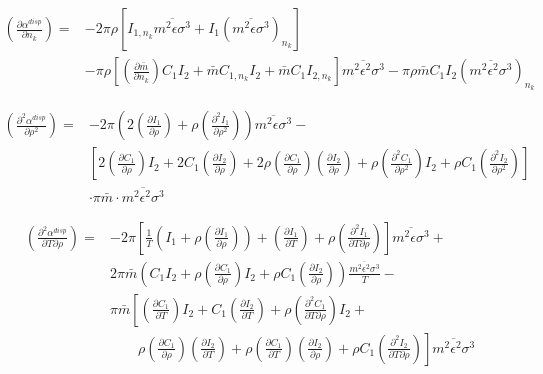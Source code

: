 \documentclass[english]{../thermomemo/thermomemo}
\newcommand*{\pder}[2]{\left(\frac{\partial #1}{\partial #2}\right)}
\newcommand*{\pdder}[2]{\left(\frac{\partial^2 #1}{\partial #2^2}\right)}
\newcommand*{\pdcross}[3]{\left(\frac{\partial^2 #1}{\partial #2 \partial #3}\right)}
\newcommand{\lp}{\left(}
\newcommand{\rp}{\right)}
\begin{document}
\begin{equation}
  \begin{aligned}
    \pder{\alpha^{disp}}{n_k} =& -2 \pi \rho \left[ I_{1,n_k} \overline{m^2 \epsilon \sigma^3} + I_1 (\overline{m^2 \epsilon \sigma^3})_{n_k} \right] \\
    &- \pi \rho \left[ \pder{\bar m}{n_k} C_1 I_2 + \bar m C_{1,n_k} I_2 + \bar m C_1 I_{2,n_k} \right] \overline{m^2 \epsilon^2 \sigma^3} - \pi \rho \bar m C_1 I_2 (\overline{m^2 \epsilon^2 \sigma^3})_{n_k}
  \end{aligned}
\end{equation}

\begin{equation}
  \begin{aligned}
    \pdder{\alpha^{disp}}{\rho} =& -2 \pi \lp 2 \pder{I_1}{\rho} + \rho \pdder{I_1}{\rho} \rp \overline{m^2 \epsilon \sigma^3} - \\
    & \left[ 2 \pder{C_1}{\rho} I_2 + 2 C_1 \pder{I_2}{\rho} + 2 \rho \pder{C_1}{\rho} \pder{I_2}{\rho} + \rho \pdder{C_1}{\rho} I_2 + \rho C_1 \pdder{I_2}{\rho} \right]  \\
    &\cdot \pi \bar m \cdot \overline{m^2 \epsilon^2 \sigma^3}
  \end{aligned}
\end{equation}

\begin{equation}
  \begin{aligned}
    \pdcross{\alpha^{disp}}{T}{\rho} =& -2 \pi \left[ \frac{1}{T}\lp I_1 + \rho \pder{I_1}{\rho} \rp + \pder{I_1}{T} + \rho \pdcross{I_1}{T}{\rho} \right] \overline{m^2 \epsilon \sigma^3} + \\
    & 2 \pi \bar m \lp C_1 I_2 + \rho \pder{C_1}{\rho} I_2 + \rho C_1 \pder{I_2}{\rho} \rp \frac{\overline{m^2 \epsilon^2 \sigma^3}}{T} - \\
    &  \pi \bar m \left[ \pder{C_1}{T} I_2 + C_1 \pder{I_2}{T} + \rho \pdcross{C_1}{T}{\rho} I_2 + \right. \\
    & \qquad \left. \rho \pder{C_1}{\rho} \pder{I_2}{T} + \rho \pder{C_1}{T} \pder{I_2}{\rho} + \rho C_1 \pdcross{I_2}{T}{\rho} \right] \overline{m^2 \epsilon^2 \sigma^3}
  \end{aligned}  
\end{equation}
\end{document}
